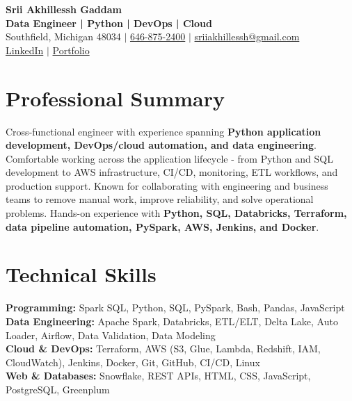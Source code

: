 \documentclass[letterpaper,10pt]{article}
\begin{document}
\fontsize{9.35pt}{10.45pt}\selectfont

\begin{center}
    {\LARGE \textbf{Srii Akhillessh Gaddam}} \\[-1pt]
    \textbf{Data Engineer | Python | DevOps | Cloud} \\[2pt]
    Southfield, Michigan 48034 $|$
    \href{tel:6468752400}{646-875-2400} $|$
    \href{mailto:sriiakhillessh@gmail.com}{sriiakhillessh@gmail.com} \\[1pt]
    \href{https://www.linkedin.com/in/srii-akhiilessh-gaddam-b48668191/}{LinkedIn} $|$
    \href{https://sriiakhillesshg.github.io/portfolio/}{Portfolio}
\end{center}
\vspace{-8pt}

\section{Professional Summary}
\small{Cross-functional engineer with experience spanning \textbf{Python application development, DevOps/cloud automation, and data engineering}. Comfortable working across the application lifecycle - from Python and SQL development to AWS infrastructure, CI/CD, monitoring, ETL workflows, and production support. Known for collaborating with engineering and business teams to remove manual work, improve reliability, and solve operational problems. Hands-on experience with \textbf{Python, SQL, Databricks, Terraform, data pipeline automation, PySpark, AWS, Jenkins, and Docker}.}

\section{Technical Skills}
\small{
\textbf{Programming:} Spark SQL, Python, SQL, PySpark, Bash, Pandas, JavaScript \\
\textbf{Data Engineering:} Apache Spark, Databricks, ETL/ELT, Delta Lake, Auto Loader, Airflow, Data Validation, Data Modeling \\
\textbf{Cloud \& DevOps:} Terraform, AWS (S3, Glue, Lambda, Redshift, IAM, CloudWatch), Jenkins, Docker, Git, GitHub, CI/CD, Linux \\
\textbf{Web \& Databases:} Snowflake, REST APIs, HTML, CSS, JavaScript, PostgreSQL, Greenplum
}

\end{document}
